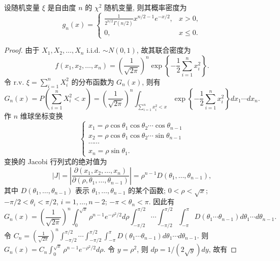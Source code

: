 \begin{theorem} \label{thm:chi_squared_pdf}
设随机变量 $\xi$ 是自由度 $n$ 的 $\chi^2$ 随机变量, 则其概率密度为
\begin{equation} \label{eq:chi_squared_pdf_formula}
g_n(x)=
\begin{cases}
\frac{1}{2^{n/2}\Gamma(n/2)}x^{n/2-1}e^{-x/2}, & x > 0, \\
0, & x \le 0.
\end{cases}
\end{equation}
\end{theorem}

\begin{proof}
由于 $X_1, X_2, \ldots, X_n$ i.i.d. $\sim N(0,1)$, 故其联合密度为
\[
f(x_1, x_2, \ldots, x_n) = \left(\frac{1}{\sqrt{2\pi}}\right)^n \exp\left\{-\frac{1}{2}\sum_{i=1}^n x_i^2\right\}.
\]
令 r.v. $\xi = \sum_{i=1}^n X_i^2$ 的分布函数为 $G_n(x)$, 则有
\[
G_n(x) = P\left(\sum_{i=1}^n X_i^2 < x\right) = \left(\frac{1}{\sqrt{2\pi}}\right)^n \int_{\sum_{i=1}^n x_i^2 < x} \exp\left\{-\frac{1}{2}\sum_{i=1}^n x_i^2\right\} dx_1 \cdots dx_n.
\]
作 $n$ 维球坐标变换
\begin{equation} \label{eq:n_dim_spherical_coordinates}
\begin{cases}
x_1 = \rho\cos\theta_1 \cos\theta_2 \cdots \cos\theta_{n-1} \\
x_2 = \rho\cos\theta_1 \cos\theta_2 \cdots \sin\theta_{n-1} \\
\cdots\cdots \\
x_n = \rho\sin\theta_1.
\end{cases}
\end{equation}
变换的 Jacobi 行列式的绝对值为
\[
|J| = \left|\frac{\partial(x_1, x_2, \ldots, x_n)}{\partial(\rho, \theta_1, \ldots, \theta_{n-1})}\right| = \rho^{n-1}D(\theta_1,\ldots,\theta_{n-1}),
\]
其中 $D(\theta_1,\ldots,\theta_{n-1})$ 表示 $\theta_1,\ldots,\theta_{n-1}$ 的某个函数; $0 < \rho < \sqrt{x}$; $-\pi/2 < \theta_i < \pi/2$, $i=1,\ldots,n-2$; $-\pi < \theta_n < \pi$. 因此有
\[
G_n(x) = \left(\frac{1}{\sqrt{2\pi}}\right)^n \int_0^{\sqrt{x}} \rho^{n-1}e^{-\rho^2/2} d\rho \int_{-\pi/2}^{\pi/2} \cdots \int_{-\pi/2}^{\pi/2} \int_{-\pi}^\pi D(\theta_1\cdots\theta_{n-1}) d\theta_1 \cdots d\theta_{n-1}.
\]
令 $C_n = \left(\frac{1}{\sqrt{2\pi}}\right)^n \int_{-\pi/2}^{\pi/2} \cdots \int_{-\pi/2}^{\pi/2} \int_{-\pi}^\pi D(\theta_1\cdots\theta_{n-1}) d\theta_1 \cdots d\theta_{n-1}$.
则 $G_n(x) = C_n \int_0^{\sqrt{x}} \rho^{n-1}e^{-\rho^2/2} d\rho$.
令 $y = \rho^2$, 则 $dp = 1/(2\sqrt{y})dy$, 故有

\end{proof}

